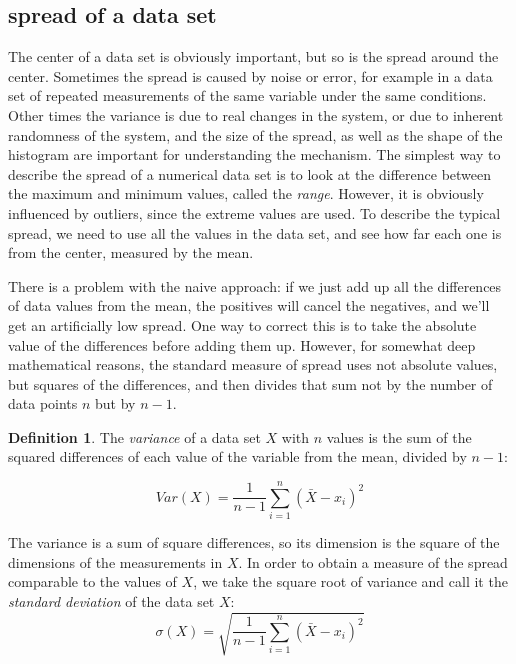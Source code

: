 \documentclass[
]{book}
\theoremstyle{definition}
\newtheorem{definition}{Definition}[chapter]
\theoremstyle{definition}
\theoremstyle{definition}
\theoremstyle{remark}
\begin{document}
\hypertarget{spread-of-a-data-set}{%
\subsection{spread of a data set}\label{spread-of-a-data-set}}

The center of a data set is obviously important, but so is the spread around the center. Sometimes the spread is caused by noise or error, for example in a data set of repeated measurements of the same variable under the same conditions. Other times the variance is due to real changes in the system, or due to inherent randomness of the system, and the size of the spread, as well as the shape of the histogram are important for understanding the mechanism. The simplest way to describe the spread of a numerical data set is to look at the difference between the maximum and minimum values, called the  \emph{range}. However, it is obviously influenced by outliers, since the extreme values are used. To describe the typical spread, we need to use all the values in the data set, and see how far each one is from the center, measured by the mean.

There is a problem with the naive approach: if we just add up all the differences of data values from the mean, the positives will cancel the negatives, and we'll get an artificially low spread. One way to correct this is to take the absolute value of the differences before adding them up. However, for somewhat deep mathematical reasons, the standard measure of spread uses not absolute values, but squares of the differences, and then divides that sum not by the number of data points \(n\) but by \(n-1\).

\begin{definition}
\protect\hypertarget{def:def-var}{}{\label{def:def-var} }The \emph{variance} of a data set \(X\) with \(n\) values is the sum of the squared differences of each value of the variable from the mean, divided by \(n-1\):
\end{definition}
\begin{equation}
 Var(X) = \frac{1}{n-1} \sum_{i=1}^n (\bar X - x_i)^2
\end{equation}

The variance is a sum of square differences, so its dimension is the square of the dimensions of the measurements in \(X\). In order to obtain a measure of the spread comparable to the values of \(X\), we take the square root of variance and call it the  \emph{standard deviation} of the data set \(X\):
\begin{equation}
\sigma(X) = \sqrt{\frac{1}{n-1} \sum_{i=1}^n (\bar X - x_i)^2}
\end{equation}
\end{document}
